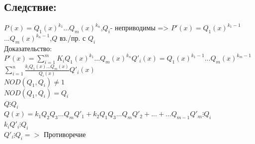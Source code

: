 \documentclass[12pt]{article}
\begin{document}
    \subsection{Следствие:}
    \noindent $P(x)=Q_1(x)^{k_1}$$... Q_m(x)^{k_n}$,$Q_i$- неприводимы => $P'(x)=Q_1(x)^{k_1-1}$$... Q_m(x)^{k_n-1}$,$Q$ вз./пр. с $Q_i$
    \\Доказательство:
    \\$P'(x)=\sum\limits _{i=1}^{m} K_iQ_1(x)^{k_1}$$...Q_m(x)^{k_n}$$Q'_i(x)=Q_1(x)^{k_1-1}$$...Q_m(x)^{k_m-1}$$\sum\limits _{i=1}^{n}\frac{k_iQ_1(x)...Q_m(x)}{Q_i(x)}Q'_i(x)$
\\$NOD(Q_1,Q_i)\neq 1$
    \\$NOD(Q_1,Q_i) = Q_i$
\\$Q \vdots Q_i$
    \\$Q(x)= k_1Q_2Q_3...Q_mQ'_1+k_2Q_1Q_3...Q_mQ'_2+...+...Q_{m-1}Q'_m\vdots Q_i$
\\$k_iQ'_i\vdots Q_i$
    \\$Q'_i\vdots Q_i =>$ Противоречие
\end{document}
